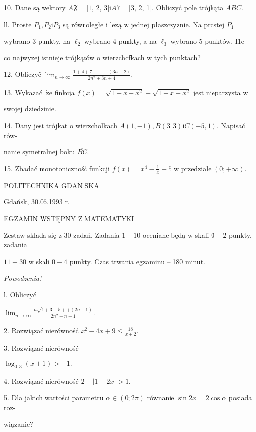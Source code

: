 \documentclass[a4paper,12pt]{article}
\begin{document}
10. Dane są wektory $\overline{A}\mathfrak{F}=[1$, 2, 3$]\mathrm{i}\overline{A}7=[3$, 2, 1$]$. Obliczyć pole trójkąta $ABC.$

ll. Proste $P_{1}, P_{2} \mathrm{i}P_{3}$ są równoległe i lezą w jednej płaszczyz$\acute{}$nie. Na prostej $P_{1}$

wybrano 3 punkty, na $\ell_{2}$ wybrano 4 punkty, a na $\ell_{3}$ wybrano 5 punktów. I1e

co najwyzej istnieje trójkątów o wierzchofkach w tych punktach?

12. Obliczyč $\displaystyle \lim_{n\rightarrow\infty}\frac{1+4+7+\ldots+(3n-2)}{2n^{2}+3n+4}.$

13. Wykazać, $\dot{\mathrm{z}}\mathrm{e}$ finkcja $f(x) = \sqrt{1+x+x^{2}}-\sqrt{1-x+x^{2}}$ jest nieparzysta w

swojej dziedzinie.

14. Dany jest trójkat o wierzcholkach $A(1,-1), B(3,3)\mathrm{i}C(-5,1)$. Napisać rów-

nanie symetralnej boku $\overline{BC}.$

15. Zbadać monotoniczność funkcji $f(x)=x^{4}-\displaystyle \frac{1}{x}+5$ w przedziale $(0;+\infty).$







POLITECHNIKA $\mathrm{G}\mathrm{D}\mathrm{A}\acute{\mathrm{N}}$ SKA

Gdańsk, 30.06.1993 r.

EGZAMIN WSTĘPNY Z MATEMATYKI

Zestaw sklada się z 30 zadań. Zadania $1-10$ oceniane będą w skali $0-2$ punkty, zadania

$11-30$ w skali $0-4$ punkty. Czas trwania egzaminu -- 180 minut.

{\it Powodzenia}.'

l. Obliczyć

$\displaystyle \lim_{n\rightarrow\infty}\frac{n\sqrt{1+3+5++(2n-1)}}{2n^{2}+n+1}.$

2. Rozwiązać nierówność $x^{2}-4x+9\displaystyle \leq\frac{18}{x+2}.$

3. Rozwiązać nierówność

$\log_{0,3}(x+1)>-1.$

4. Rozwiązać nierówność $2-|1-2x|>1.$

5. Dla jakich wartości parametru $\alpha \in (0;2\pi)$ równanie $\sin 2x=  2\cos\alpha$ posiada roz-

wiązanie?
\end{document}
